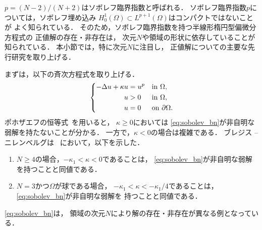 $p = (N-2)/(N+2)$はソボレフ臨界指数と呼ばれる．
ソボレフ臨界指数$p$については，ソボレフ埋め込み
$H^1_0(\Omega) \subset L^{p+1}(\Omega)$はコンパクトではないことが
よく知られている．
そのため，ソボレフ臨界指数を持つ半線形楕円型偏微分方程式の
正値解の存在・非存在は，
次元$N$や領域の形状に依存していることが知られている．
本小節では，特に次元$N$に注目し，
正値解についての主要な先行研究を取り上げる．

まずは，以下の斉次方程式を取り上げる．
\begin{align}
 \left\{
 \begin{aligned}
  -\Delta u + \kappa u &= u^p & &\text{in}~ \Omega,  \\
  u &> 0 & &\text{in}~ \Omega, \\
  u &= 0 & &\text{on}~ \partial\Omega.
 \end{aligned}
 \right. \label{eq:sobolev_bn}
\end{align}
ポホザエフの恒等式~\cite{MR0192184}を用いると，
$\kappa \geq 0$においては
\eqref{eq:sobolev_bn}が非自明な弱解を持たないことが分かる．
一方で，$\kappa < 0$の場合は複雑である．
ブレジス -- ニレンベルグは
\cite{MR709644}~において，以下を示した．
\begin{enumerate}[1.] \sage
 \item $N \geq 4$の場合，$-\kappa_1 < \kappa < 0$であることは，
       \eqref{eq:sobolev_bn}が非自明な弱解を持つことと同値である．
 \item $N = 3$かつ$\Omega$が球である場合，
       $-\kappa_1 < \kappa < -\kappa_1/4$であることは，
       \eqref{eq:sobolev_bn}が非自明な弱解を
       持つことと同値である．
\end{enumerate}
\eqref{eq:sobolev_bn}は，
領域の次元$N$により解の存在・非存在が異なる例となっている．

